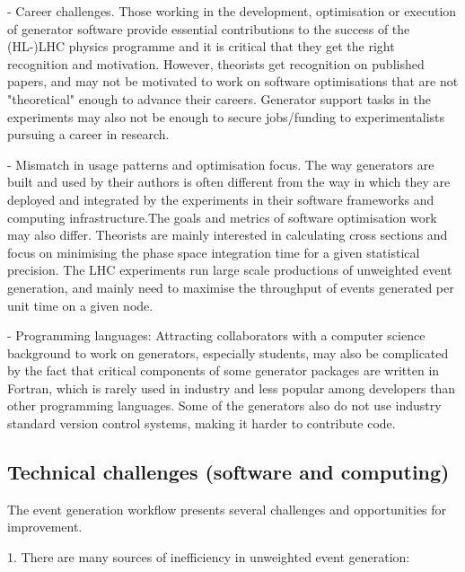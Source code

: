 \documentclass[11pt,a4paper]{article}
\begin{document}
- {Career challenges}. Those working in the development, optimisation or
execution of generator software provide essential contributions to the
success of the (HL-)LHC physics programme and it is critical that they
get the right recognition and motivation. However, theorists get
recognition on published papers, and may not be motivated to work on
software optimisations that are not "theoretical" enough to advance
their careers. Generator support tasks in the experiments may also not
be enough to secure jobs/funding to experimentalists pursuing a career
in research.

- {Mismatch in usage patterns and optimisation focus}. The way
generators are built and used by their authors is often different from
the way in which they are deployed and integrated by the experiments in
their software frameworks and computing infrastructure.The goals and
metrics of software optimisation work may also differ. Theorists are
mainly interested in calculating cross sections and focus on minimising
the phase space integration time for a given statistical precision. The
LHC experiments run large scale productions of unweighted event
generation, and mainly need to maximise the throughput of events
generated per unit time on a given node.

- {Programming languages}: Attracting collaborators with a computer
science background to work on generators, especially students, may also
be complicated by the fact that critical components of some generator
packages are written in Fortran, which is rarely used in industry and
less popular among developers than other programming languages. Some of
the generators also do not use industry standard version control
systems, making it harder to contribute code.

\hypertarget{technical-challenges-software-and-computing}{%
\subsection{Technical challenges (software and
computing)}\label{technical-challenges-software-and-computing}}

The event generation workflow presents several challenges and
opportunities for improvement.

1. There are many sources of inefficiency in unweighted event
generation:
\end{document}
